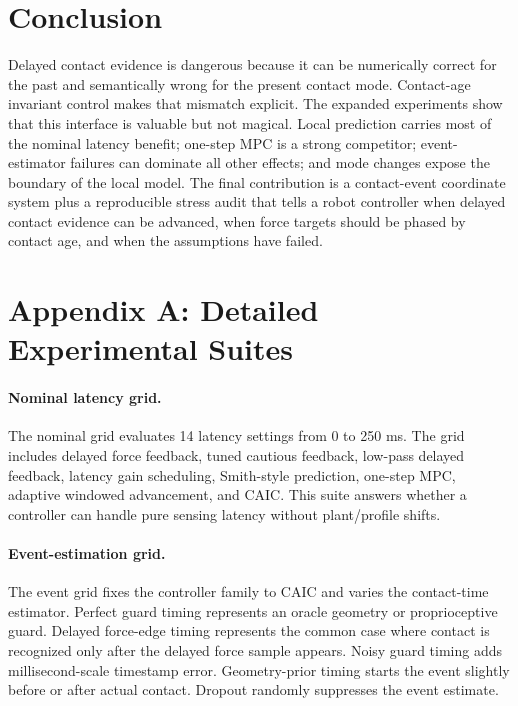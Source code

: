 \documentclass{article}
\newcommand{\caic}{CAIC}
\begin{document}
\section{Conclusion}

Delayed contact evidence is dangerous because it can be numerically correct for the past and semantically wrong for the present contact mode. Contact-age invariant control makes that mismatch explicit. The expanded experiments show that this interface is valuable but not magical. Local prediction carries most of the nominal latency benefit; one-step MPC is a strong competitor; event-estimator failures can dominate all other effects; and mode changes expose the boundary of the local model. The final contribution is a contact-event coordinate system plus a reproducible stress audit that tells a robot controller when delayed contact evidence can be advanced, when force targets should be phased by contact age, and when the assumptions have failed.

\clearpage
\appendix

\section{Appendix A: Detailed Experimental Suites}

\paragraph{Nominal latency grid.}
The nominal grid evaluates 14 latency settings from 0 to 250 ms. The grid includes delayed force feedback, tuned cautious feedback, low-pass delayed feedback, latency gain scheduling, Smith-style prediction, one-step MPC, adaptive windowed advancement, and \caic{}. This suite answers whether a controller can handle pure sensing latency without plant/profile shifts.

\paragraph{Event-estimation grid.}
The event grid fixes the controller family to \caic{} and varies the contact-time estimator. Perfect guard timing represents an oracle geometry or proprioceptive guard. Delayed force-edge timing represents the common case where contact is recognized only after the delayed force sample appears. Noisy guard timing adds millisecond-scale timestamp error. Geometry-prior timing starts the event slightly before or after actual contact. Dropout randomly suppresses the event estimate.
\end{document}
